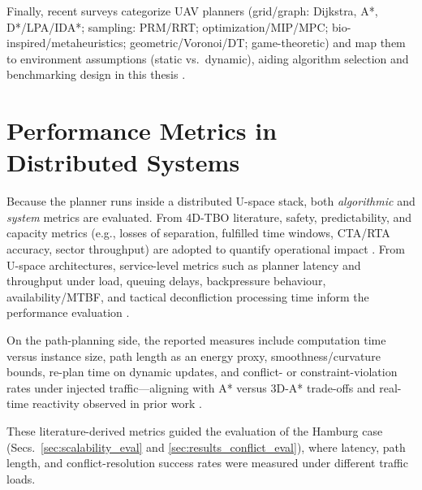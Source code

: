 Finally, recent surveys categorize UAV planners (grid/graph: Dijkstra, A*, D*/LPA/IDA*; sampling: PRM/RRT; optimization/MIP/MPC; bio-inspired/metaheuristics; geometric/Voronoi/DT; game-theoretic) and map them to environment assumptions (static vs.\ dynamic), aiding algorithm selection and benchmarking design in this thesis \cite{ahmad2023_uav_path_planning_survey}.

\section{Performance Metrics in Distributed Systems}
\label{s_performance_metrics}

Because the planner runs inside a distributed U-space stack, both \emph{algorithmic} and \emph{system} metrics are evaluated. From 4D-TBO literature, safety, predictability, and capacity metrics (e.g., losses of separation, fulfilled time windows, CTA/RTA accuracy, sector throughput) are adopted to quantify operational impact \cite{enea_porretta_4d_tbo_comparison}.  
From U-space architectures, service-level metrics such as planner latency and throughput under load, queuing delays, backpressure behaviour, availability/MTBF, and tactical deconfliction processing time inform the performance evaluation \cite{uspace_inflight_services_architecture,acevedo_4d_grids_u_space}.  

On the path-planning side, the reported measures include computation time versus instance size, path length as an energy proxy, smoothness/curvature bounds, re-plan time on dynamic updates, and conflict- or constraint-violation rates under injected traffic—aligning with A* versus 3D-A* trade-offs and real-time reactivity observed in prior work \cite{a_star_2d3d_comparison_utm,sahawneh2016_3d_path_planning}.  

These literature-derived metrics guided the evaluation of the Hamburg case (Secs.~\ref{sec:scalability_eval} and \ref{sec:results_conflict_eval}), where latency, path length, and conflict-resolution success rates were measured under different traffic loads.
